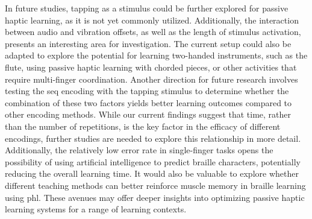 In future studies, tapping as a stimulus could be further explored for passive haptic learning, as it is not yet commonly utilized. Additionally, the interaction between audio and vibration offsets, as well as the length of stimulus activation, presents an interesting area for investigation. The current setup could also be adapted to explore the potential for learning two-handed instruments, such as the flute, using passive haptic learning with chorded pieces, or other activities that require multi-finger coordination.
Another direction for future research involves testing the \gls{seq} encoding with the tapping stimulus to determine whether the combination of these two factors yields better learning outcomes compared to other encoding methods. While our current findings suggest that time, rather than the number of repetitions, is the key factor in the efficacy of different encodings, further studies are needed to explore this relationship in more detail.
Additionally, the relatively low error rate in single-finger tasks opens the possibility of using artificial intelligence to predict braille characters, potentially reducing the overall learning time. It would also be valuable to explore whether different teaching methods can better reinforce muscle memory in braille learning using \gls{phl}. These avenues may offer deeper insights into optimizing passive haptic learning systems for a range of learning contexts.

